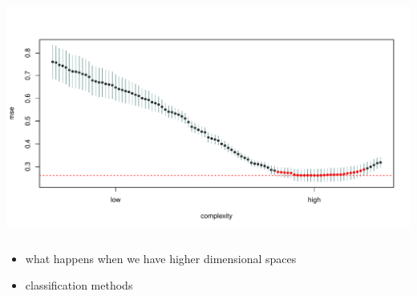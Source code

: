 \documentclass[xetex,mathserif,serif,aspectratio=169]{beamer}
\begin{document}
\begin{frame}[fragile] \frametitle{} \oldB \small

\begin{center}
\includegraphics[width=\textwidth]{img/cv4.pdf}
\end{center}

\end{frame}


\begin{frame}[fragile] \frametitle{} \oldB \small


\begin{itemize}
\item what happens when we have higher dimensional spaces
\item classification methods
\end{itemize}

\end{frame}
\end{document}
